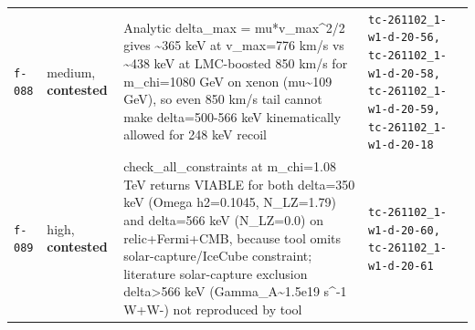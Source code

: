 \documentclass[11pt,a4paper]{article}
\begin{document}
\begin{longtable}{@{}p{}p{}p{}p{}@{}}
\texttt{f-088} & medium, \textbf{contested} & Analytic delta\_max = mu*v\_max\textasciicircum{}2/2 gives \textasciitilde{}365 keV at v\_max=776 km/s vs \textasciitilde{}438 keV at LMC-boosted 850 km/s for m\_chi=1080 GeV on xenon (mu\textasciitilde{}109 GeV), so even 850 km/s tail cannot make delta=500-566 keV kinematically allowed for 248 keV recoil & \texttt{tc-261102\_\allowbreak{}1-w1-d-20-56,\allowbreak{} tc-261102\_\allowbreak{}1-w1-d-20-58,\allowbreak{} tc-261102\_\allowbreak{}1-w1-d-20-59,\allowbreak{} tc-261102\_\allowbreak{}1-w1-d-20-18} \\
\texttt{f-089} & high, \textbf{contested} & check\_all\_constraints at m\_chi=1.08 TeV returns VIABLE for both delta=350 keV (Omega h2=0.1045, N\_LZ=1.79) and delta=566 keV (N\_LZ=0.0) on relic+Fermi+CMB, because tool omits solar-capture/IceCube constraint; literature solar-capture exclusion delta\textgreater{}566 keV (Gamma\_A\textasciitilde{}1.5e19 s\textasciicircum{}-1 W+W-) not reproduced by tool & \texttt{tc-261102\_\allowbreak{}1-w1-d-20-60,\allowbreak{} tc-261102\_\allowbreak{}1-w1-d-20-61} \\
\bottomrule\end{longtable}
\end{document}
